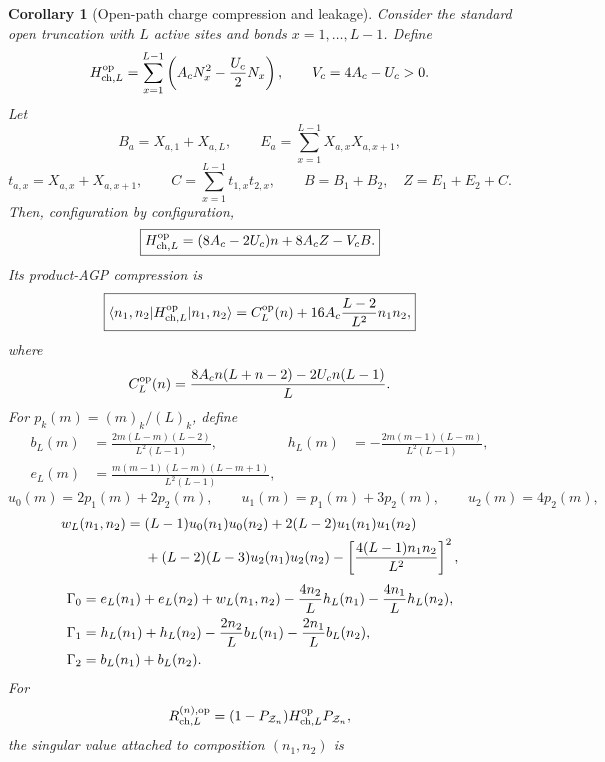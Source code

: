 \documentclass[11pt]{article}
\newtheorem{corollary}[theorem]{Corollary}
\theoremstyle{definition}
\theoremstyle{remark}
\newcommand{\ket}[1]{\lvert #1\rangle}
\newcommand{\bra}[1]{\langle #1\rvert}
\begin{document}
\begin{corollary}[Open-path charge compression and leakage]
\label{cor:charge-leakage-open}
Consider the standard open truncation with $L$ active sites and bonds
$x=1,\ldots,L-1$.  Define
\[
 H_{{\rm ch},L}^{\rm op}
 =\sum_{x=1}^{L-1}\left(A_c N_x^2-\frac{U_c}{2}N_x\right),
 \qquad V_c=4A_c-U_c>0.
\]
Let
\[
 B_a=X_{a,1}+X_{a,L},\qquad
 E_a=\sum_{x=1}^{L-1}X_{a,x}X_{a,x+1},
\]
\[
 t_{a,x}=X_{a,x}+X_{a,x+1},\qquad
 C=\sum_{x=1}^{L-1}t_{1,x}t_{2,x},
 \qquad B=B_1+B_2,\quad Z=E_1+E_2+C.
\]
Then, configuration by configuration,
\begin{equation}
 \boxed{
 H_{{\rm ch},L}^{\rm op}
 =(8A_c-2U_c)n+8A_cZ-V_cB.}
 \label{eq:open-charge-decomposition}
\end{equation}
Its product-AGP compression is
\begin{equation}
 \boxed{
 \bra{n_1,n_2}H_{{\rm ch},L}^{\rm op}\ket{n_1,n_2}
 =C_L^{\rm op}(n)+16A_c\frac{L-2}{L^2}n_1n_2,}
 \label{eq:open-charge-selector}
\end{equation}
where
\begin{equation}
 C_L^{\rm op}(n)
 =\frac{8A_cn(L+n-2)-2U_cn(L-1)}{L}.
 \label{eq:open-charge-baseline}
\end{equation}
For $p_k(m)=(m)_k/(L)_k$, define
\begin{align}
 b_L(m)&=\frac{2m(L-m)(L-2)}{L^2(L-1)},
 &h_L(m)&=-\frac{2m(m-1)(L-m)}{L^2(L-1)},
 \label{eq:open-b-h}\\
 e_L(m)&=\frac{m(m-1)(L-m)(L-m+1)}{L^2(L-1)},
 \label{eq:open-e}
\end{align}
\[
 u_0(m)=2p_1(m)+2p_2(m),\qquad
 u_1(m)=p_1(m)+3p_2(m),\qquad
 u_2(m)=4p_2(m),
\]
\begin{align}
 w_L(n_1,n_2)={}&(L-1)u_0(n_1)u_0(n_2)
 +2(L-2)u_1(n_1)u_1(n_2)\notag\\
 &+(L-2)(L-3)u_2(n_1)u_2(n_2)
 -\left[\frac{4(L-1)n_1n_2}{L^2}\right]^2,
 \label{eq:open-w}
\end{align}
\begin{align}
 \Gamma_0={}&e_L(n_1)+e_L(n_2)+w_L(n_1,n_2)
 -\frac{4n_2}{L}h_L(n_1)-\frac{4n_1}{L}h_L(n_2),\notag\\
 \Gamma_1={}&h_L(n_1)+h_L(n_2)
 -\frac{2n_2}{L}b_L(n_1)-\frac{2n_1}{L}b_L(n_2),\notag\\
 \Gamma_2={}&b_L(n_1)+b_L(n_2).
 \label{eq:open-gammas}
\end{align}
For
\[
 R_{{\rm ch},L}^{(n),\rm op}
 =(1-P_{\mathcal Z_n})H_{{\rm ch},L}^{\rm op}P_{\mathcal Z_n},
\]
the singular value attached to composition $(n_1,n_2)$ is

\end{corollary}
\end{document}
